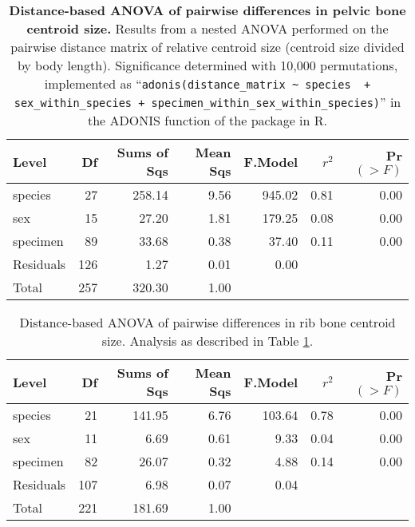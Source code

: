 

\begin{table}[ht]
\centering
\begin{tabular}{lrrrrrr}
  \hline
 Level & Df & Sums of Sqs & Mean Sqs & F.Model & $r^2$ & Pr$(>F)$ \\ 
  \hline
  species &  27 & 258.14 & 9.56 & 945.02 & 0.81 & 0.00 \\ 
  sex &  15 & 27.20 & 1.81 & 179.25 & 0.08 & 0.00 \\ 
  specimen &  89 & 33.68 & 0.38 & 37.40 & 0.11 & 0.00 \\ 
  Residuals & 126 & 1.27 & 0.01 & 0.00 &  &  \\ 
  Total & 257 & 320.30 & 1.00 &  &  &  \\ 
   \hline
\end{tabular}
\caption{
\textbf{Distance-based ANOVA of pairwise differences in pelvic bone centroid size.}  Results from a nested ANOVA performed on the pairwise distance matrix of relative centroid size (centroid size divided by body length).  Significance determined with 10,000 permutations, implemented as ``\lstinline{adonis(distance_matrix ~ species  + sex_within_species + specimen_within_sex_within_species)}'' in the ADONIS function of the \citet{oksanen2013} package in R. 
\label{stab:anova1}
}
\end{table}

\begin{table}[ht]
\centering
\begin{tabular}{lrrrrrr}
  \hline
 Level & Df & Sums of Sqs & Mean Sqs & F.Model & $r^2$ & Pr$(>F)$ \\ 
  \hline
  species &  21 & 141.95 & 6.76 & 103.64 & 0.78 & 0.00 \\ 
  sex &  11 & 6.69 & 0.61 & 9.33 & 0.04 & 0.00 \\ 
  specimen &  82 & 26.07 & 0.32 & 4.88 & 0.14 & 0.00 \\ 
  Residuals & 107 & 6.98 & 0.07 & 0.04 &  &  \\ 
  Total & 221 & 181.69 & 1.00 &  &  &  \\ 
   \hline
\end{tabular}
\caption{
Distance-based ANOVA of pairwise differences in rib bone centroid size.  Analysis as described in Table \ref{stab:anova1}.
}
\end{table}


